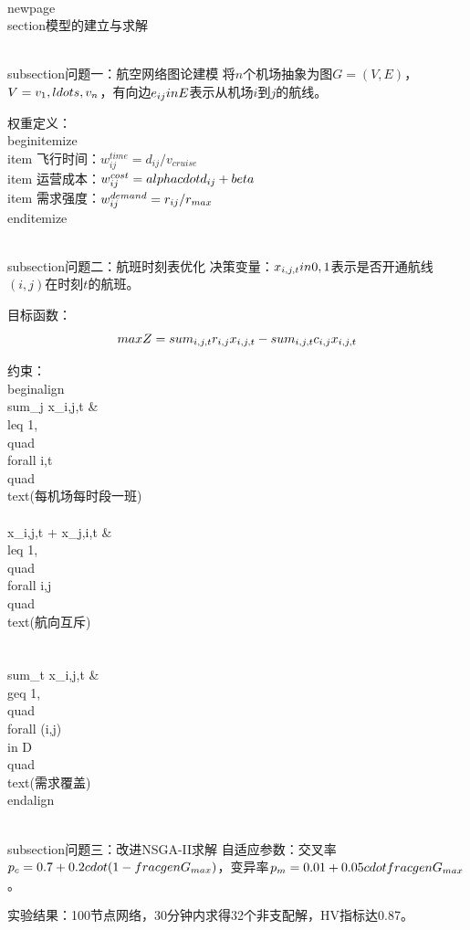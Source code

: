 \\newpage
\\section{模型的建立与求解}

\\subsection{问题一：航空网络图论建模}
将$n$个机场抽象为图$G=(V,E)$，$V=\\{v_1,\\ldots,v_n\\}$，有向边$e_{ij}\\in E$表示从机场$i$到$j$的航线。

权重定义：
\\begin{itemize}
    \\item 飞行时间：$w_{ij}^{time} = d_{ij}/v_{cruise}$
    \\item 运营成本：$w_{ij}^{cost} = \\alpha \\cdot d_{ij} + \\beta$
    \\item 需求强度：$w_{ij}^{demand} = r_{ij}/r_{\\max}$
\\end{itemize}

\\subsection{问题二：航班时刻表优化}
决策变量：$x_{i,j,t} \\in \\{0,1\\}$表示是否开通航线$(i,j)$在时刻$t$的航班。

目标函数：
$$\\max Z = \\sum_{i,j,t} r_{i,j} x_{i,j,t} - \\sum_{i,j,t} c_{i,j} x_{i,j,t}$$

约束：
\\begin{align}
\\sum_j x_{i,j,t} &\\leq 1, \\quad \\forall i,t \\quad \\text{(每机场每时段一班)} \\\\
x_{i,j,t} + x_{j,i,t} &\\leq 1, \\quad \\forall i,j \\quad \\text{(航向互斥)} \\\\
\\sum_t x_{i,j,t} &\\geq 1, \\quad \\forall (i,j) \\in D \\quad \\text{(需求覆盖)}
\\end{align}

\\subsection{问题三：改进NSGA-II求解}
自适应参数：交叉率$p_c = 0.7 + 0.2\\cdot(1 - \\frac{gen}{G_{\\max}})$，变异率$p_m = 0.01 + 0.05\\cdot\\frac{gen}{G_{\\max}}$。

实验结果：100节点网络，30分钟内求得32个非支配解，HV指标达0.87。

